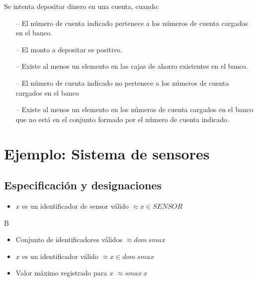 \begin{tcolorbox}[colback=gray!5!white,colframe=gray!50!black,
  colbacktitle=gray!75!black,title=Depositar\_SP\_8]
  Se intenta depositar dinero en una cuenta, cuando:
     \begin{itemize}
        \item[--]{El número de cuenta indicado pertenece a los números de cuenta cargados en el banco.}
        \item[--]{El monto a depositar es positivo.}
        \item[--]{Existe al menos un elemento en las cajas de ahorro existentes en el banco.}
        \item[--]{El número de cuenta indicado no pertenece a los números de cuenta cargados en el banco}
        \item[--]{Existe al menos un elemento en los números de cuenta cargados en el banco que no está en el conjunto formado por el número de cuenta indicado.}
     \end{itemize}
\end{tcolorbox}

\section*{Ejemplo: Sistema de sensores}

\subsection*{Especificación y designaciones}

\begin{itemize}
  \item $x$ es un identificador de sensor válido $\approx x \in SENSOR$
\end{itemize}B

\begin{zed}
[SENSOR]
\end{zed}

\begin{itemize}
  \item Conjunto de identificadores válidos $\approx dom~smax$ \\
  \item $x$ es un identificador válido $\approx x \in dom~smax$ \\
  \item Valor máximo registrado para $x$ $\approx smax~x$ \\
\end{itemize}

